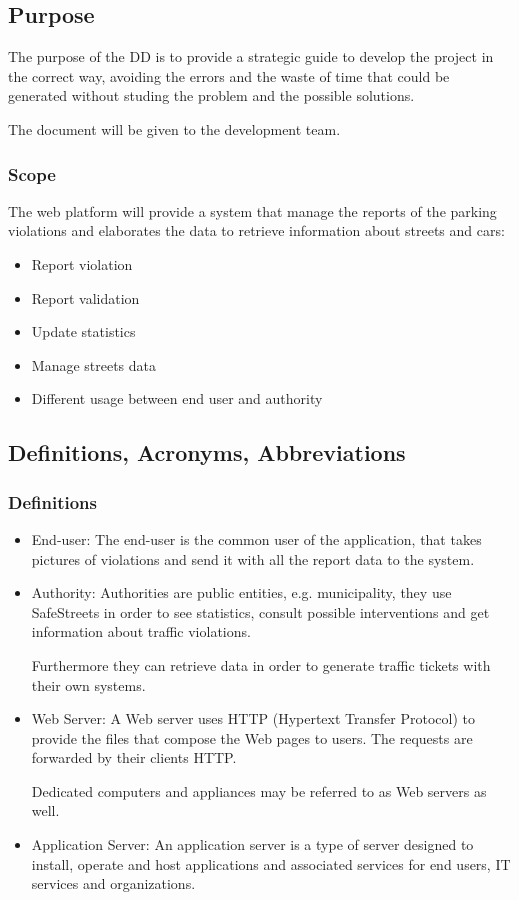 \subsection{Purpose}
The purpose of the DD is to provide a strategic guide to develop the project in the correct way, avoiding the errors and the waste of time that could be generated without studing the problem and the possible solutions. 

The document will be given to the development team.

\subsubsection{Scope}
The web platform will provide a system that manage the reports of the parking violations and elaborates the data to retrieve information about streets and cars:
\begin{itemize}
	\item
	Report violation
	\item 
	Report validation
	\item
	Update statistics
	\item
	Manage streets data
	\item
	Different usage between end user and authority
\end{itemize}
\subsection{Definitions, Acronyms, Abbreviations}
\subsubsection{Definitions}
\begin{itemize}
	\item 
	End-user: The end-user is the common user of the application, that takes pictures of violations and send it with all the report data to the system.
	\item 
	Authority: Authorities are public entities, e.g. municipality, they use SafeStreets in order to see statistics, consult possible interventions and get information about traffic violations.
	
	
	Furthermore they can retrieve data in order to generate traffic tickets with their own systems.
	\item 
	Web Server: A Web server uses HTTP (Hypertext Transfer Protocol) to provide the files that compose the Web pages to users. The requests are forwarded by their clients HTTP.
	 
	Dedicated computers and appliances may be referred to as Web servers as well.
	\item 
	Application Server: An application server is a type of server designed to install, operate and host applications and associated services for end users, IT services and organizations.
\end{itemize}
